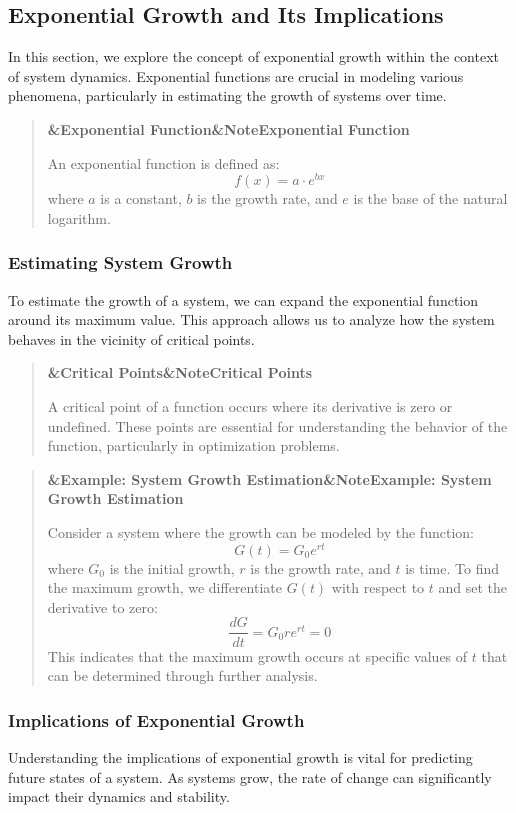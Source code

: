\documentclass[a4paper]{article}
\newcommand{\boxheading}[1]{%
  \par\smallskip
  \noindent\textbf{\ifx&#1&Note\else#1\fi}\par
  \smallskip
}
\newenvironment{thmbox}[1][]{%
  \begin{quote}\color{blue!60!black}\boxheading{#1}\normalcolor
}{\end{quote}}
\newenvironment{defbox}[1][]{%
  \begin{quote}\color{green!40!black}\boxheading{#1}\normalcolor
}{\end{quote}}
\newenvironment{exbox}[1][]{%
  \begin{quote}\color{brown!70!black}\boxheading{#1}\normalcolor
}{\end{quote}}
\begin{document}
\subsection{Exponential Growth and Its Implications}
In this section, we explore the concept of exponential growth within the context of system dynamics. Exponential functions are crucial in modeling various phenomena, particularly in estimating the growth of systems over time.

\begin{defbox}[Exponential Function]
An exponential function is defined as:
\[
f(x) = a \cdot e^{bx}
\]
where \( a \) is a constant, \( b \) is the growth rate, and \( e \) is the base of the natural logarithm.
\end{defbox}

\subsubsection{Estimating System Growth}
To estimate the growth of a system, we can expand the exponential function around its maximum value. This approach allows us to analyze how the system behaves in the vicinity of critical points.

\begin{thmbox}[Critical Points]
A critical point of a function occurs where its derivative is zero or undefined. These points are essential for understanding the behavior of the function, particularly in optimization problems.
\end{thmbox}

\begin{exbox}[Example: System Growth Estimation]
Consider a system where the growth can be modeled by the function:
\[
G(t) = G_0 e^{rt}
\]
where \( G_0 \) is the initial growth, \( r \) is the growth rate, and \( t \) is time. To find the maximum growth, we differentiate \( G(t) \) with respect to \( t \) and set the derivative to zero:
\[
\frac{dG}{dt} = G_0 r e^{rt} = 0
\]
This indicates that the maximum growth occurs at specific values of \( t \) that can be determined through further analysis.
\end{exbox}

\subsubsection{Implications of Exponential Growth}
Understanding the implications of exponential growth is vital for predicting future states of a system. As systems grow, the rate of change can significantly impact their dynamics and stability.
\end{document}
